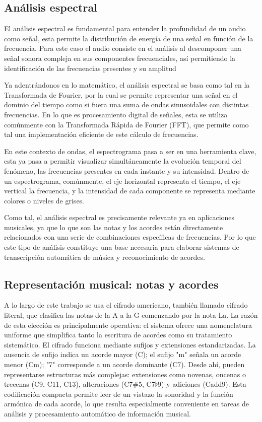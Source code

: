 \subsection{Análisis espectral}
El análisis espectral es fundamental para entender la profundidad de un audio como señal, esta permite la distribución de energía de una señal en función de la frecuencia. Para este caso el audio consiste en el análisis al descomponer una señal sonora compleja en sus componentes frecuenciales, así permitiendo la identificación de las frecuencias presentes y su amplitud

Ya adentrándonos en lo matemático, el análisis espectral se basa como tal en la Transformada de Fourier, por la cual se permite representar una señal en el dominio del tiempo como si fuera una suma de ondas sinusoidales con distintas frecuencias. En lo que es procesamiento digital de señales, esta se utiliza comúnmente con la Transformada Rápida de Fourier (FFT), que permite como tal una implementación eficiente de este cálculo de frecuencias.

En este contexto de ondas, el espectrograma pasa a ser en una herramienta clave, esta ya pasa a permitir visualizar simultáneamente la evolución temporal del fenómeno, las frecuencias presentes en cada instante y su intensidad. Dentro de un espectrograma, comúnmente, el eje horizontal representa el tiempo, el eje vertical la frecuencia, y la intensidad de cada componente se representa mediante colores o niveles de grises.

Como tal, el análisis espectral es precisamente relevante ya en aplicaciones musicales, ya que lo que son las notas y los acordes están directamente relacionados con una serie de combinaciones específicas de frecuencias. Por lo que este tipo de análisis constituye una base necesaria para elaborar sistemas de transcripción automática de música y reconocimiento de acordes.


\subsection{Representación musical: notas y acordes}
A lo largo de este trabajo se usa el cifrado americano, también llamado cifrado literal, que clasifica las notas de la A a la G comenzando por la nota La. La razón de esta elección es principalmente operativa: el sistema ofrece una nomenclatura uniforme que simplifica tanto la escritura de acordes como su tratamiento sistemático.
El cifrado funciona mediante sufijos y extensiones estandarizadas. La ausencia de sufijo indica un acorde mayor (C); el sufijo "m" señala un acorde menor (Cm); "7" corresponde a un acorde dominante (C7). Desde ahí, pueden representarse estructuras más complejas: extensiones como novenas, oncenas o trecenas (C9, C11, C13), alteraciones (C7\#5, C7$\flat$9) y adiciones (Cadd9). Esta codificación compacta permite leer de un vistazo la sonoridad y la función armónica de cada acorde, lo que resulta especialmente conveniente en tareas de análisis y procesamiento automático de información musical.

